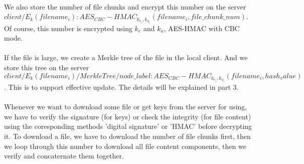 \documentclass[a4paper, 11pt]{article}
\begin{document}
\\
We also store the number of file chunks and encrypt this number on the server $client/E_k(filename_i) : AES_{CBC}-HMAC_{k_{e_i},k_{a_i}}(filename_i, file\_chunk\_num)$. Of course, this number is encrypted using $k_e$ and $k_a$, AES-HMAC with CBC mode.\\
\\
If the file is large, we create a Merkle tree of the file in the local client. And we store this tree on the server\\$client/E_k(filename_i)/MerkleTree/node\_label : AES_{CBC}-HMAC_{k_{e_i},k_{a_i}}(filename_i, hash_value)$. This is to support effective update. The details will be explained in part 3.\\
\\
Whenever we want to download some file or get keys from the server for using, we have to verify the signature (for keys) or check the integrity (for file content) using the coresponding methods 'digital signature' or 'HMAC' before decrypting it. To download a file, we have to download the number of file chunks first, then we loop through this number to download all file content components, then we verify and concaternate them together.\\
\\
\end{document}
